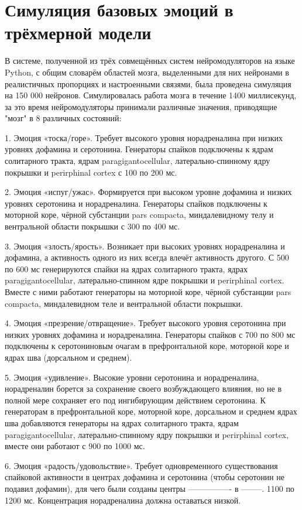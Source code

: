 \chapter{Симуляция базовых эмоций в трёхмерной модели}
\label{chap:results}
В системе, полученной из трёх совмещённых систем нейромодуляторов на языке Python, с общим словарём областей мозга, выделенными для них нейронами в реалистичных пропорциях и настроенными связями, была проведена симуляция на 150 000 нейронов. Симулировалась работа мозга в течение 1400 миллисекунд, за это время нейромодуляторы принимали различные значения, приводящие "мозг" в 8 различных состояний:


1. Эмоция «тоска/горе». Требует высокого уровня норадреналина при низких уровнях дофамина и серотонина. Генераторы спайков подключены к ядрам солитарного тракта, ядрам paragigantocellular, латерально-спинному ядру покрышки и perirphinal cortex с 100 по 200 мс.


2. Эмоция «испуг/ужас». Формируется при высоком уровне дофамина и низких уровнях серотонина и норадреналина. Генераторы спайков подключены к моторной коре, чёрной субстанции pars compacta, миндалевидному телу и вентральной области покрышки с 300 по 400 мс.


3. Эмоция «злость/ярость». Возникает при высоких уровнях норадреналина и  дофамина, а активность одного из них всегда влечёт активность другого. С 500 по 600 мс генерируются спайки на ядрах солитарного тракта, ядрах paragigantocellular, латерально-спинном ядре покрышки и perirphinal cortex. Вместе с ними работают генераторы на моторной коре, чёрной субстанции pars compacta, миндалевидном теле и вентральной области покрышки.


4. Эмоция «презрение/отвращение». Требует высокого уровня серотонина при низких уровнях дофамина и норадреналина. Генераторы спайков с 700 по 800 мс подключены к серотониновым очагам в префронтальной коре, моторной коре и ядрах шва (дорсальном и среднем).


5. Эмоция «удивление». Высокие уровни серотонина и норадреналина, норадреналин борется за сохранение своего возбуждающего влияния, но не в полной мере сохраняет его под ингибирующим действием серотонина. К генераторам в префронтальной коре, моторной коре, дорсальном и среднем ядрах шва добавляются генераторы на ядрах солитарного тракта, ядрам paragigantocellular, латерально-спинному ядру покрышки и perirphinal cortex, вместе они работают с 900 по 1000 мс.


6. Эмоция «радость/удовольствие». Требует одновременного существования спайковой активности в центрах дофамина и серотонина (чтобы серотонин не подавил дофамин), для чего были созданы центры ---------------- в --------. 1100 по 1200 мс. Концентрация норадреналина должна оставаться низкой. 


